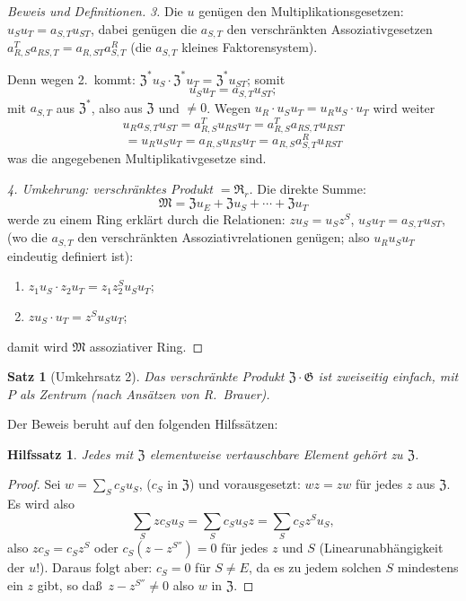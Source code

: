 \documentclass[12pt,a4paper]{article}
\theoremstyle{plain}
\newtheorem{satz}{Satz}[section]
\newtheorem{hilfssatz}{Hilfssatz}[section]
\theoremstyle{definition}
\theoremstyle{remark}
\begin{document}
\begin{proof}[Beweis und Definitionen]
\textit{3.} Die $u$ gen\"ugen den Multiplikationsgesetzen:
$u_{S}u_{T} = a_{S,T}u_{ST}$, dabei gen\"ugen die $a_{S,T}$ den
verschr\"ankten Assoziativgesetzen
$a_{R,S}^{T}a_{RS,T} = a_{R,ST}a_{S,T}^{R}$ (die $a_{S,T}$ kleines
Faktorensystem).

Denn wegen 2.\ kommt: $\mathfrak{Z}^{*}u_{S} \cdot \mathfrak{Z}^{*}u_{T} = \mathfrak{Z}^{*}u_{ST}$; somit
\[
u_{S}u_{T} = a_{S,T}u_{ST};
\]
mit $a_{S,T}$ aus $\mathfrak{Z}^{*}$, also aus $\mathfrak{Z}$ und $\neq 0$. Wegen
$u_{R} \cdot u_{S}u_{T} = u_{R}u_{S} \cdot u_{T}$ wird weiter
\[
u_{R}a_{S,T}u_{ST} = a_{R,S}^{T}u_{RS}u_{T} = a_{R,S}^{T}a_{RS,T}u_{RST}
\]
\[
= u_{R}u_{S}u_{T} = a_{R,S}u_{RS}u_{T} = a_{R,S}a_{S,T}^{R}u_{RST}
\]
was die angegebenen Multiplikativgesetze sind.

\textit{4. Umkehrung: verschr\"anktes Produkt $= \mathfrak{R}_{r}$.} Die direkte Summe:
\[
\mathfrak{M} = \mathfrak{Z}u_{E} + \mathfrak{Z}u_{S} + \cdots + \mathfrak{Z}u_{T}
\]
werde zu einem Ring erkl\"art durch die Relationen:
$zu_{S} = u_{S}z^{S}$, $u_{S}u_{T} = a_{S,T}u_{ST}$, (wo die $a_{S,T}$ den
verschr\"ankten Assoziativrelationen gen\"ugen; also $u_{R}u_{S}u_{T}$
eindeutig definiert ist):
\begin{enumerate}
\item $z_{1}u_{S} \cdot z_{2}u_{T} = z_{1}z_{2}^{S}u_{S}u_{T}$;
\item $zu_{S} \cdot u_{T} = z^{S}u_{S}u_{T}$;
\end{enumerate}
damit wird $\mathfrak{M}$ assoziativer Ring.
\end{proof}

\begin{satz}[Umkehrsatz 2]\label{satz:27-2}
Das verschr\"ankte Produkt $\mathfrak{Z} \cdot \mathfrak{G}$ ist zweiseitig einfach, mit $P$
als Zentrum (nach Ans\"atzen von R.\ Brauer).
\end{satz}

Der Beweis beruht auf den folgenden Hilfss\"atzen:

\begin{hilfssatz}\label{hilf:27-1}
Jedes mit $\mathfrak{Z}$ elementweise vertauschbare Element geh\"ort zu $\mathfrak{Z}$.
\end{hilfssatz}

\begin{proof}
Sei $w = \sum_{S}c_{S}u_{S}$, ($c_{S}$ in $\mathfrak{Z}$) und vorausgesetzt: $wz = zw$
f\"ur jedes $z$ aus $\mathfrak{Z}$. Es wird also
\[
\sum_{S}zc_{S}u_{S} = \sum_{S}c_{S}u_{S}z = \sum_{S}c_{S}z^{S}u_{S},
\]
also $zc_{S} = c_{S}z^{S}$ oder $c_{S}(z - z^{S''}) = 0$ f\"ur jedes $z$ und
$S$ (Linearunabh\"angigkeit der $u$!). Daraus folgt aber:
$c_{S} = 0$ f\"ur $S \neq E$, da es zu jedem solchen $S$ mindestens ein
$z$ gibt, so da\ss\ $z - z^{S''} \neq 0$ also $w$ in $\mathfrak{Z}$.
\end{proof}
\end{document}
